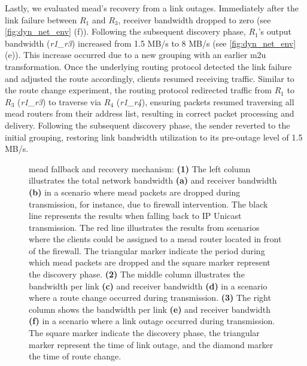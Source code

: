 Lastly, we evaluated \gls{mead}'s recovery from a link outages.
Immediately after the link failure between $R_1$ and $R_3$, receiver
    bandwidth dropped to zero (see \autoref{fig:dyn_net_env} (f)).
Following the subsequent discovery phase, $R_1$'s output bandwidth
    (\textit{r1\_r3}) increased from 1.5 MB/s to 8 MB/s (see
    \autoref{fig:dyn_net_env} (e)).
This increase occurred due to a new grouping with an earlier \gls{m2u}
    transformation.
Once the underlying routing protocol detected the link failure and adjusted
    the route accordingly, clients resumed receiving traffic.
Similar to the route change experiment, the routing protocol redirected traffic
    from $R_1$ to $R_3$ (\textit{r1\_r3}) to traverse via $R_4$
    (\textit{r1\_r4}), ensuring packets resumed traversing all \gls{mead}
    routers from their address list, resulting in correct packet processing
    and delivery.
Following the subsequent discovery phase, the sender reverted to the initial
    grouping, restoring link bandwidth utilization to its pre-outage level of
    1.5 MB/s.

\begin{figure}
    \begin{center}
        
    \end{center}
    \caption[MEADcast fallback and recovery mechanism]{
        \nuciii{} \gls{mead} fallback and recovery mechanism:
        \textbf{(1)} The left column illustrates the total network bandwidth
            \textbf{(a)} and receiver bandwidth \textbf{(b)} in a scenario
            where \gls{mead} packets are dropped during transmission, for
            instance, due to firewall intervention.
        The black line represents the results when falling back to IP Unicast
            transmission.
        The red line illustrates the results from scenarios where the clients
            could be assigned to a \gls{mead} router located in front of the
            firewall.
        The triangular marker indicate the period during which \gls{mead} packets
            are dropped and the square marker represent the discovery phase.
        \textbf{(2)} The middle column illustrates the bandwidth per link
            \textbf{(c)} and receiver bandwidth \textbf{(d)} in a scenario
            where a route change occurred during transmission.
        \textbf{(3)} The right column  shows the bandwidth per link
            \textbf{(e)} and receiver bandwidth \textbf{(f)} in a scenario
            where a link outage occurred during transmission.
        The square marker indicate the discovery phase, the triangular marker
            represent the time of link outage, and the diamond marker the time 
            of route change.
        }
    \label{fig:dyn_net_env}
\end{figure}

